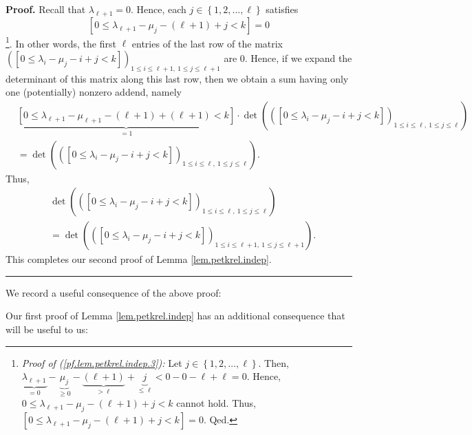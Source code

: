 \documentclass[numbers=enddot,12pt,final,onecolumn,notitlepage]{scrartcl}%
\theoremstyle{definition}
\newenvironment{proof}[1][Proof]{\noindent\textbf{#1.} }{\ \rule{0.5em}{0.5em}}
\newenvironment{verlong}{}{}
\newenvironment{vershort}{}{}
\begin{document}
\begin{verlong}
\begin{proof}
Recall that $\lambda_{\ell+1}=0$. Hence, each $j\in\left\{  1,2,\ldots
,\ell\right\}  $ satisfies%
\begin{equation}
\left[  0\leq\lambda_{\ell+1}-\mu_{j}-\left(  \ell+1\right)  +j<k\right]  =0
\label{pf.lem.petkrel.indep.3}%
\end{equation}
\footnote{\textit{Proof of (\ref{pf.lem.petkrel.indep.3}):} Let $j\in\left\{
1,2,\ldots,\ell\right\}  $. Then, $\underbrace{\lambda_{\ell+1}}%
_{=0}-\underbrace{\mu_{j}}_{\geq0}-\underbrace{\left(  \ell+1\right)  }%
_{>\ell}+\underbrace{j}_{\leq\ell}<0-0-\ell+\ell=0$. Hence, $0\leq
\lambda_{\ell+1}-\mu_{j}-\left(  \ell+1\right)  +j<k$ cannot hold. Thus,
$\left[  0\leq\lambda_{\ell+1}-\mu_{j}-\left(  \ell+1\right)  +j<k\right]
=0$. Qed.}. In other words, the first $\ell$ entries of the last row of the
matrix \newline$\left(  \left[  0\leq\lambda_{i}-\mu_{j}-i+j<k\right]
\right)  _{1\leq i\leq\ell+1,\ 1\leq j\leq\ell+1}$ are $0$. Hence, if we
expand the determinant of this matrix along this last row, then we obtain a
sum having only one (potentially) nonzero addend, namely%
\begin{align*}
&  \underbrace{\left[  0\leq\lambda_{\ell+1}-\mu_{\ell+1}-\left(
\ell+1\right)  +\left(  \ell+1\right)  <k\right]  }_{=1}\cdot\det\left(
\left(  \left[  0\leq\lambda_{i}-\mu_{j}-i+j<k\right]  \right)  _{1\leq
i\leq\ell,\ 1\leq j\leq\ell}\right) \\
&  =\det\left(  \left(  \left[  0\leq\lambda_{i}-\mu_{j}-i+j<k\right]
\right)  _{1\leq i\leq\ell,\ 1\leq j\leq\ell}\right)  .
\end{align*}
Thus,%
\begin{align*}
&  \det\left(  \left(  \left[  0\leq\lambda_{i}-\mu_{j}-i+j<k\right]  \right)
_{1\leq i\leq\ell,\ 1\leq j\leq\ell}\right) \\
&  =\det\left(  \left(  \left[  0\leq\lambda_{i}-\mu_{j}-i+j<k\right]
\right)  _{1\leq i\leq\ell+1,\ 1\leq j\leq\ell+1}\right)  .
\end{align*}
This completes our second proof of Lemma \ref{lem.petkrel.indep}.
\end{proof}
\end{verlong}

\begin{vershort}
We record a useful consequence of the above proof:
\end{vershort}

\begin{verlong}
Our first proof of Lemma \ref{lem.petkrel.indep} has an additional consequence
that will be useful to us:
\end{verlong}
\end{document}
